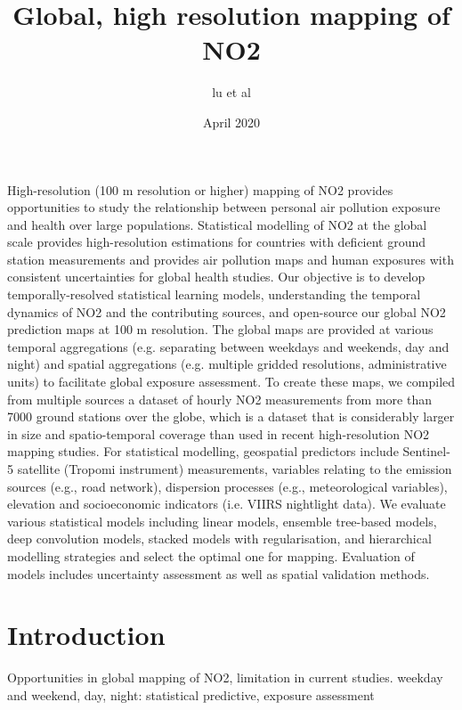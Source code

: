 \documentclass{article}
\title{Global, high resolution mapping of NO2}
\author{lu et al}
\date{April 2020}
\begin{document}
\maketitle

\abstract

High-resolution (100 m resolution or higher) mapping of NO2 provides opportunities to study the relationship between personal air pollution exposure and health over large populations. Statistical modelling of NO2 at the global scale provides high-resolution estimations for countries with deficient ground station measurements and provides air pollution maps and human exposures with consistent uncertainties for global health studies. Our objective is to develop temporally-resolved statistical learning models, understanding the temporal dynamics of NO2 and the contributing sources, and open-source our global NO2 prediction maps at 100 m resolution. The global maps are provided at various temporal aggregations (e.g. separating between weekdays and weekends, day and night) and spatial aggregations (e.g. multiple gridded resolutions, administrative units) to facilitate global exposure assessment. To create these maps, we compiled from multiple sources a dataset of hourly NO2 measurements from more than 7000 ground stations over the globe, which is a dataset that is considerably larger in size and spatio-temporal coverage than used in recent high-resolution NO2 mapping studies. For statistical modelling, geospatial predictors include Sentinel-5 satellite (Tropomi instrument) measurements, variables relating to the emission sources (e.g., road network), dispersion processes (e.g., meteorological variables), elevation and socioeconomic indicators (i.e. VIIRS nightlight data). We evaluate various statistical models including linear models, ensemble tree-based models, deep convolution models, stacked models with regularisation, and hierarchical modelling strategies and select the optimal one for mapping. Evaluation of models includes uncertainty assessment as well as spatial validation methods. 

\section{Introduction}
Opportunities in global mapping of NO2, limitation in current studies. 
weekday and weekend, day, night: statistical predictive, exposure assessment
\end{document}
